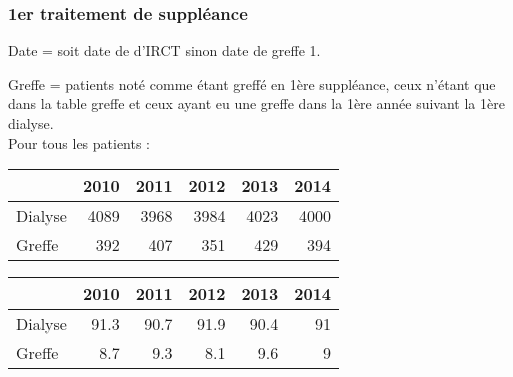 \documentclass[11pt,a4paper]{article}\usepackage[]{graphicx}\usepackage[]{color}
\begin{document}
% 
% 
% 
% 


    \subsubsection{1er traitement de suppléance}

Date = soit date de d'IRCT sinon date de greffe 1. 

Greffe = patients noté comme étant greffé en 1ère suppléance, ceux n'étant que dans la table greffe et ceux ayant eu une greffe dans la 1ère année suivant la 1ère dialyse.
~\\

Pour tous les patients :

\begin{table}[H]
\centering
\begin{tabular}{lrrrrr}
  \hline
 & 2010 & 2011 & 2012 & 2013 & 2014 \\ 
  \hline
Dialyse & 4089 & 3968 & 3984 & 4023 & 4000 \\ 
  Greffe & 392 & 407 & 351 & 429 & 394 \\ 
   \hline
\end{tabular}
\end{table}
\begin{table}[H]
\centering
\begin{tabular}{lrrrrr}
  \hline
 & 2010 & 2011 & 2012 & 2013 & 2014 \\ 
  \hline
Dialyse & 91.3 & 90.7 & 91.9 & 90.4 & 91 \\ 
  Greffe & 8.7 & 9.3 & 8.1 & 9.6 & 9 \\ 
   \hline
\end{tabular}
\end{table}
\end{document}
